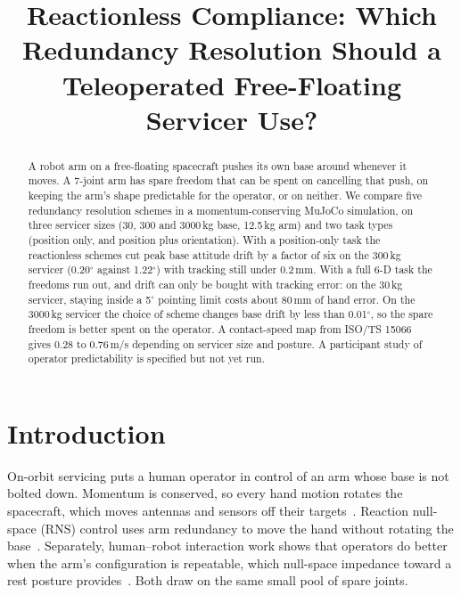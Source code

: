 \documentclass[conference]{IEEEtran}
\newcommand{\todo}[1]{\textcolor{red}{[TODO: #1]}}
\begin{document}
\title{Reactionless Compliance: Which Redundancy Resolution Should a Teleoperated Free-Floating Servicer Use?}
\author{\IEEEauthorblockN{\todo{five names}}}
\maketitle

\begin{abstract}
A robot arm on a free-floating spacecraft pushes its own base around whenever it moves. A 7-joint
arm has spare freedom that can be spent on cancelling that push, on keeping the arm's shape
predictable for the operator, or on neither. We compare five redundancy resolution schemes in a
momentum-conserving MuJoCo simulation, on three servicer sizes (30, 300 and 3000\,kg base, 12.5\,kg
arm) and two task types (position only, and position plus orientation). With a position-only task
the reactionless schemes cut peak base attitude drift by a factor of six on the 300\,kg servicer
(0.20$^\circ$ against 1.22$^\circ$) with tracking still under 0.2\,mm. With a full 6-D task the freedoms run
out, and drift can only be bought with tracking error: on the 30\,kg servicer, staying inside a
5$^\circ$ pointing limit costs about 80\,mm of hand error. On the 3000\,kg servicer the choice of scheme
changes base drift by less than 0.01$^\circ$, so the spare freedom is better spent on the operator.
A contact-speed map from ISO/TS 15066 gives 0.28 to 0.76\,m/s depending on servicer size and
posture. A participant study of operator predictability is specified but not yet run.
\end{abstract}

\section{Introduction}
On-orbit servicing puts a human operator in control of an arm whose base is not bolted down.
Momentum is conserved, so every hand motion rotates the spacecraft, which moves antennas and
sensors off their targets~\cite{dubowsky1993,umetani1989}. Reaction null-space (RNS) control uses
arm redundancy to move the hand without rotating the base~\cite{nenchev1999,yoshida2001}.
Separately, human--robot interaction work shows that operators do better when the arm's
configuration is repeatable, which null-space impedance toward a rest posture
provides~\cite{hogan1985,dragan2013}. Both draw on the same small pool of spare joints.
\end{document}

